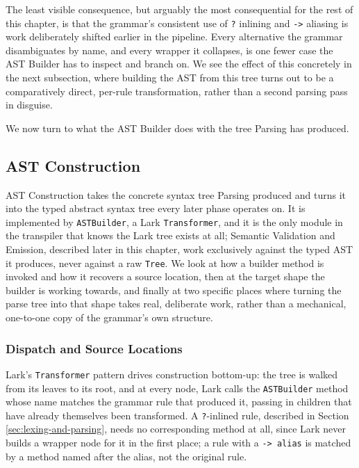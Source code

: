 The least visible consequence, but arguably the most consequential for the rest of this chapter, is that the grammar's consistent use of \lstinline|?| inlining and \lstinline|->| aliasing is work deliberately shifted earlier in the pipeline. Every alternative the grammar disambiguates by name, and every wrapper it collapses, is one fewer case the AST Builder has to inspect and branch on. We see the effect of this concretely in the next subsection, where building the AST from this tree turns out to be a comparatively direct, per-rule transformation, rather than a second parsing pass in disguise.

We now turn to what the AST Builder does with the tree Parsing has produced.

\subsection{AST Construction}
\label{sec:ast-construction}
AST Construction takes the concrete syntax tree Parsing produced and turns it into the typed abstract syntax tree every later phase operates on. It is implemented by \lstinline|ASTBuilder|, a Lark \lstinline|Transformer|, and it is the only module in the transpiler that knows the Lark tree exists at all; Semantic Validation and Emission, described later in this chapter, work exclusively against the typed AST it produces, never against a raw \lstinline|Tree|. We look at how a builder method is invoked and how it recovers a source location, then at the target shape the builder is working towards, and finally at two specific places where turning the parse tree into that shape takes real, deliberate work, rather than a mechanical, one-to-one copy of the grammar's own structure.

\subsubsection{Dispatch and Source Locations}
Lark's \lstinline|Transformer| pattern drives construction bottom-up: the tree is walked from its leaves to its root, and at every node, Lark calls the \lstinline|ASTBuilder| method whose name matches the grammar rule that produced it, passing in children that have already themselves been transformed. A \lstinline|?|-inlined rule, described in Section \ref{sec:lexing-and-parsing}, needs no corresponding method at all, since Lark never builds a wrapper node for it in the first place; a rule with a \lstinline|-> alias| is matched by a method named after the alias, not the original rule.

